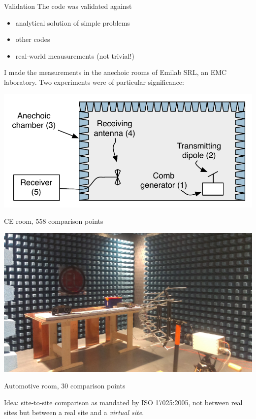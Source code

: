 \documentclass{beamer}
\begin{document}
\begin{frame}{Validation}
    \small
    The code was validated against
    \begin{itemize}
        \item analytical solution of simple problems
        \item other codes
        \item \textcolor{uniud-orange}{real-world meausurements} (not trivial!)
    \end{itemize}
    \pause
    I made the measurements in the anechoic rooms of Emilab SRL, an EMC laboratory. Two experiments were of particular significance:
    \vspace{2mm}

    \begin{minipage}{0.5\textwidth}
        \includegraphics[width=\textwidth]{img/setup.pdf}

        {\tiny CE room, 558 comparison points}
    \end{minipage}
    \hfill
    \begin{minipage}{0.4\textwidth}
        \includegraphics[width=\textwidth]{img/camera.jpg}

        {\tiny Automotive room, 30 comparison points}
    \end{minipage}%

    \vspace{2mm}

    \textcolor{uniud-orange}{Idea: site-to-site comparison as mandated by ISO 17025:2005, not between real sites but between a real site and a \emph{virtual site}.}
\end{frame}
\end{document}
